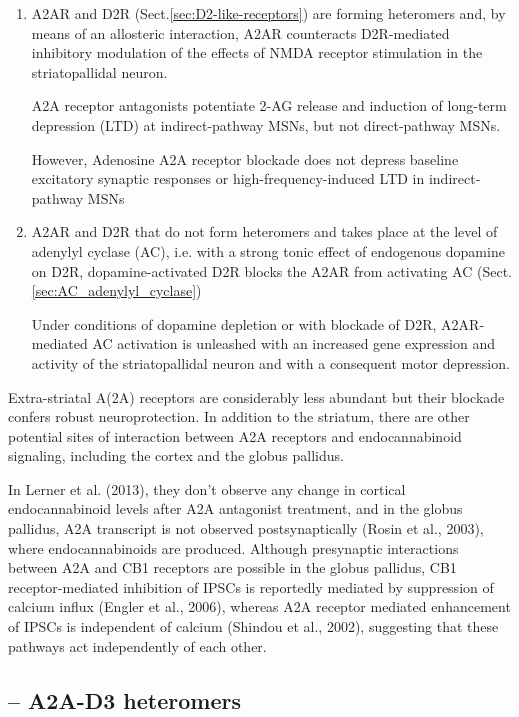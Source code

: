   \begin{enumerate}
    \item  A2AR and D2R (Sect.\ref{sec:D2-like-receptors}) are forming heteromers and, by
  means of an allosteric interaction, A2AR counteracts D2R-mediated inhibitory modulation of the
  effects of NMDA receptor stimulation in the striatopallidal neuron.
  
 A2A receptor antagonists potentiate 2-AG release and induction of long-term
depression (LTD) at indirect-pathway MSNs, but not direct-pathway MSNs.

However, Adenosine A2A receptor blockade does not depress baseline excitatory
synaptic responses or high-frequency-induced LTD in indirect-pathway MSNs
  
    \item A2AR and D2R that do not form heteromers and takes place at the level
    of adenylyl cyclase (AC), i.e. with a strong tonic effect of endogenous
    dopamine on D2R, dopamine-activated D2R blocks the A2AR from activating
    AC (Sect.\ref{sec:AC_adenylyl_cyclase})
    
    Under conditions of dopamine depletion or with blockade of D2R,
    A2AR-mediated AC activation is unleashed with an increased gene expression
    and activity of the striatopallidal neuron and with a consequent motor
    depression.
    
  \end{enumerate}

Extra-striatal A(2A) receptors are considerably less abundant but their blockade
confers robust neuroprotection. In addition to the striatum, there are other
potential sites of interaction between A2A receptors and endocannabinoid
signaling, including the cortex and the globus pallidus.

In Lerner et al. (2013), they don't observe any change in cortical
endocannabinoid levels after A2A antagonist treatment, and in the globus
pallidus, A2A transcript is not observed postsynaptically (Rosin et al., 2003),
where endocannabinoids are produced. Although presynaptic interactions between
A2A and CB1 receptors are possible in the globus pallidus, CB1 receptor-mediated
inhibition of IPSCs is reportedly mediated by suppression of calcium influx
(Engler et al., 2006), whereas A2A receptor mediated enhancement of IPSCs is
independent of calcium (Shindou et al., 2002), suggesting that these pathways
act independently of each other.

\subsection{-- A2A-D3 heteromers}
\label{sec:A2A-receptor-D3-receptor-heteromer}

